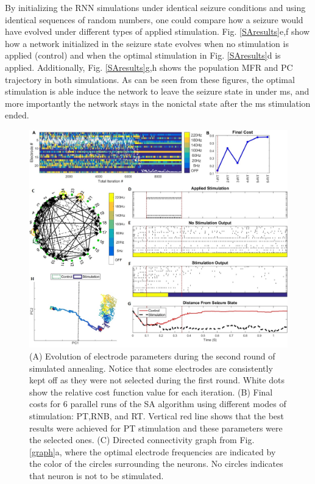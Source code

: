 \documentclass[11pt,a4paper,final]{article}
\begin{document}
By initializing the RNN simulations under identical seizure conditions and using identical sequences of random numbers, one could compare how a seizure would have evolved under different types of applied stimulation.
Fig. \ref{SAresults}e,f show how a network initialized in the seizure state evolves when no stimulation is applied (control) and when the optimal stimulation in Fig. \ref{SAresults}d is applied.
Additionally, Fig. \ref{SAresults}g,h shows the population MFR and PC trajectory in both simulations.
As can be seen from these figures, the optimal stimulation is able induce the network to leave the seizure state in under \len{}ms, and more importantly the network stays in the nonictal state after the \len{} ms stimulation ended.

\begin{figure}[!ht]
	\centering
	\includegraphics[width=160mm]{SAresults}
	\caption[Simulated Annealing Results]{
		(A) Evolution of electrode parameters during the second round of simulated annealing. Notice that some electrodes are consistently kept off as they were not selected during the first round. White dots show the relative cost function value for each iteration. 
		(B) Final costs for 6 parallel runs of the SA algorithm using different modes of stimulation: PT,RNB, and RT. Vertical red line shows that the best results were achieved for PT stimulation and these parameters were the selected ones.	
		(C) Directed connectivity graph from Fig. \ref{graph}a, where the optimal electrode frequencies are indicated by the color of the circles surrounding the neurons. No circles indicates that neuron is not to be stimulated.
}
\end{figure}
\end{document}
